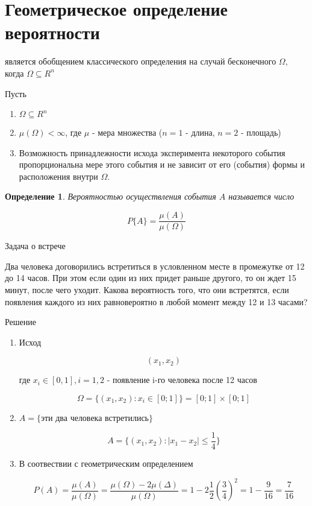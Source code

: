 \documentclass[a4paper, 14pt]{report}
\newtheorem{defenition}{Определение}[section]
\begin{document}
\section{Геометрическое определение вероятности}

является обобщением классического определения на случай бесконечного $\Omega$, когда $\Omega \subseteq R^n$

Пусть

\begin{enumerate}
    \item $\Omega \subseteq R^n$
    \item $\mu(\Omega) < \infty$, где $\mu$ - мера множества ($n=1$ - длина, $n=2$ - площадь)
    \item Возможность принадлежности исхода эксперимента некоторого события пропорциональна мере этого события и не зависит от его (события) формы и расположения внутри $\Omega$.
\end{enumerate}

\begin{defenition}
    Вероятностью осуществления события $A$ называется число

    $$
    P\{A\} = \frac{\mu(A)}{\mu(\Omega)}
    $$
\end{defenition}

Задача о встрече

Два человека договорились встретиться в условленном месте в промежутке от 12 до 14 часов. При этом если один из них придет раньше другого, то он ждет 15 минут, после чего уходит. Какова вероятность того, что они встретятся, если появления каждого из них равновероятно в любой момент между 12 и 13 часами?

Решение

\begin{enumerate}
    \item Исход

        $$
        (x_1,x_2)
        $$

        где $x_i \in [0,1], i = 1,2$ - появление i-го человека после 12 часов

        $$
        \Omega = \{ (x_1,x_2) : x_i \in [0;1]\} = [0;1] \times [0;1]
        $$

    \item $A = \{\text{эти два человека встретились}\}$

        $$
        A = \{ (x_1,x_2) : |x_1-x_2| \le \frac{1}{4}\}
        $$

    \item В соотвествии с геометрическим определением

        $$
        P(A) = \frac{\mu(A)}{\mu(\Omega)} = \frac{\mu(\Omega) - 2 \mu(\Delta)}{\mu(\Omega)} = 1 - 2 \frac{1}{2} (\frac{3}{4})^2 = 1 - \frac{9}{16} = \frac{7}{16}
        $$
\end{enumerate}
\end{document}
